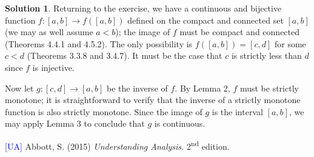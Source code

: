 \documentclass[12pt]{article}
\theoremstyle{definition}
\theoremstyle{exercise}
\theoremstyle{solution}
\newtheorem*{solution}{Solution}
\newcommand{\ts}{\textsuperscript}
\begin{document}
\begin{solution}
    \vspace{2mm}

    Returning to the exercise, we have a continuous and bijective function \( f : [a, b] \to f([a, b]) \) defined on the compact and connected set \( [a, b] \) (we may as well assume \( a < b \)); the image of \( f \) must be compact and connected (Theorems 4.4.1 and 4.5.2). The only possibility is \( f([a, b]) = [c, d] \) for some \( c < d \) (Theorems 3.3.8 and 3.4.7). It must be the case that \( c \) is strictly less than \( d \) since \( f \) is injective.

    Now let \( g : [c, d] \to [a, b] \) be the inverse of \( f \). By Lemma 2, \( f \) must be strictly monotone; it is straightforward to verify that the inverse of a strictly monotone function is also strictly monotone. Since the image of \( g \) is the interval \( [a, b] \), we may apply Lemma 3 to conclude that \( g \) is continuous.
\end{solution}

\noindent \hrulefill

\noindent \hypertarget{ua}{\textcolor{blue}{[UA]} Abbott, S. (2015) \textit{Understanding Analysis.} 2\ts{nd} edition.}
\end{document}
